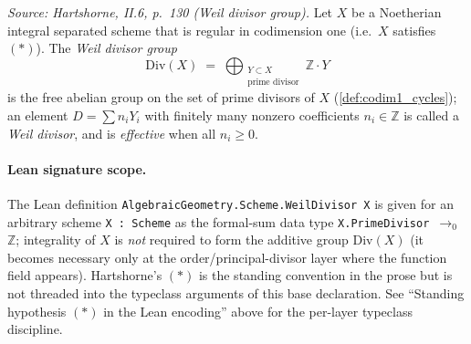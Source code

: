 \begin{definition}
  \label{def:codim1_cycles}
  
  \textit{Source: Hartshorne, II.6, p.~130 (Weil divisor group).}
  Let \(X\) be a Noetherian integral separated scheme that is regular in
  codimension one (i.e.\ \(X\) satisfies \((*)\)). The \emph{Weil divisor group}
  \[
    \mathrm{Div}(X) \;=\; \bigoplus_{\substack{Y \subset X \\ \text{prime divisor}}}
    \mathbb Z \cdot Y
  \]
  is the free abelian group on the set of prime divisors of \(X\)
  (\ref{def:codim1_cycles}); an element \(D = \sum n_i Y_i\) with finitely
  many nonzero coefficients \(n_i \in \mathbb Z\) is called a \emph{Weil
  divisor}, and is \emph{effective} when all \(n_i \geq 0\).
  \paragraph{Lean signature scope.} The Lean definition
  \texttt{AlgebraicGeometry.Scheme.WeilDivisor X} is given for an arbitrary
  scheme \texttt{X : Scheme} as the formal-sum data type
  \texttt{X.PrimeDivisor \(\to_0\) \(\mathbb Z\)}; integrality of \(X\) is
  \emph{not} required to form the additive group \(\mathrm{Div}(X)\) (it becomes
  necessary only at the order/principal-divisor layer where the function
  field appears). Hartshorne's \((*)\) is the standing convention in the
  prose but is not threaded into the typeclass arguments of this base
  declaration. See ``Standing hypothesis \((*)\) in the Lean encoding'' above
  for the per-layer typeclass discipline.
\end{definition}
